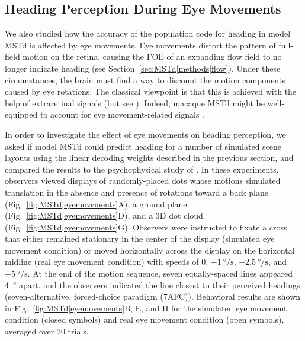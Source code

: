 \subsection{Heading Perception During Eye Movements}
\label{sec:MSTd|results|eyemovements}
We also studied how the accuracy of the population code for heading in model
\ac{MSTd} is affected by eye movements. Eye movements distort the pattern of 
full-field motion on the retina, causing the \ac{FOE} of an expanding flow 
field to no longer indicate heading (see Section~\ref{sec:MSTd|methods|flow}).
Under these circumstances, the brain must find a way to discount the motion
components caused by eye rotations. The classical viewpoint is that this is
achieved with the help of extraretinal signals \citep{Wallach1987}
(but see \cite{Kim2015}). Indeed, macaque \ac{MSTd} might be well-equipped 
to account for eye movement-related signals
\citep{KomatsuWurtz1988,Newsome1988,Bradley1996,PageDuffy1999,Morris2012}.

In order to investigate the effect of eye movements on heading perception, 
we asked if model \ac{MSTd} could predict heading for a number of simulated 
scene layouts using the linear decoding weights described in the previous 
section, and compared the results to the psychophysical study of 
\cite{Royden1994}. In these experiments, observers viewed displays of 
randomly-placed dots whose motions simulated translation in the absence 
and presence of rotations toward a back plane 
(Fig.~\ref{fig:MSTd|eyemovements}A), a ground plane
(Fig.~\ref{fig:MSTd|eyemovements}D), and a 3D dot cloud
(Fig.~\ref{fig:MSTd|eyemovements}G). Observers were instructed to fixate a
cross that either remained stationary in the center of the display (simulated
eye movement condition) or moved horizontally across the display on the 
horizontal midline (real eye movement condition) with speeds of $0$, 
$\pm \SI{1}{\degree\per\second}$, $\pm \SI{2.5}{\degree\per\second}$,
and $\pm \SI{5}{\degree\per\second}$. At the end of the motion sequence, 
seven equally-spaced lines appeared \SI{4}{\degree} apart, and the observers
indicated the line closest to their perceived headings (seven-alternative, 
forced-choice paradigm (7AFC)). Behavioral results are shown in 
Fig.~\ref{fig:MSTd|eyemovements}B, E, and H for the simulated eye movement
condition (closed symbols) and real eye movement condition (open symbols), 
averaged over $20$ trials.

